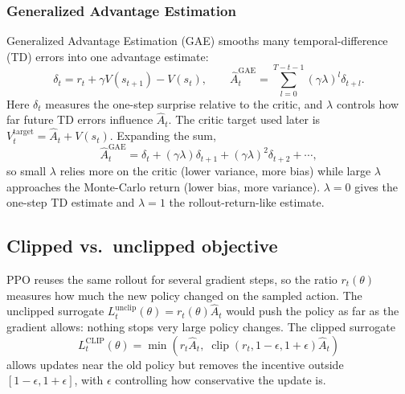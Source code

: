 \documentclass{article}
\begin{document}
\subsubsection{Generalized Advantage Estimation}

Generalized Advantage Estimation (GAE) smooths many temporal-difference (TD) errors into one advantage estimate:
\[
  \delta_t = r_t + \gamma V(s_{t+1}) - V(s_t), \qquad \hat{A}_t^{\mathrm{GAE}} = \sum_{l=0}^{T-t-1} (\gamma\lambda)^l \delta_{t+l}.
\]
Here $\delta_t$ measures the one-step surprise relative to the critic, and $\lambda$ controls how far future TD errors influence $\hat{A}_t$. The critic target used later is $V_t^{\mathrm{target}} = \hat{A}_t + V(s_t)$. Expanding the sum,
\[
  \hat{A}_t^{\mathrm{GAE}} = \delta_t + (\gamma\lambda)\delta_{t+1} + (\gamma\lambda)^2\delta_{t+2} + \cdots,
\]
so small $\lambda$ relies more on the critic (lower variance, more bias) while large $\lambda$ approaches the Monte-Carlo return (lower bias, more variance). $\lambda=0$ gives the one-step TD estimate and $\lambda=1$ the rollout-return-like estimate.

\subsection{Clipped vs.\ unclipped objective}

PPO reuses the same rollout for several gradient steps, so the ratio $r_t(\theta)$ measures how much the new policy changed on the sampled action. The unclipped surrogate $L_t^{\mathrm{unclip}}(\theta)=r_t(\theta)\hat{A}_t$ would push the policy as far as the gradient allows: nothing stops very large policy changes. The clipped surrogate
\[
  L_t^{\mathrm{CLIP}}(\theta) = \min\!\left( r_t\hat{A}_t,\; \operatorname{clip}(r_t, 1-\epsilon, 1+\epsilon)\hat{A}_t \right)
\]
allows updates near the old policy but removes the incentive outside $[1-\epsilon, 1+\epsilon]$, with $\epsilon$ controlling how conservative the update is.

\end{document}
